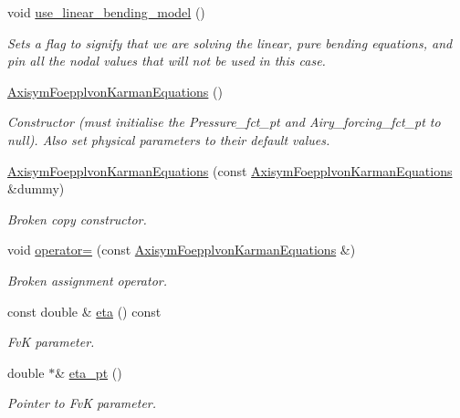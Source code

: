 \begin{DoxyCompactItemize}
void \hyperlink{classoomph_1_1AxisymFoepplvonKarmanEquations_abddb3d7358a6039420bf6ed58e7a5547}{use\+\_\+linear\+\_\+bending\+\_\+model} ()
\begin{DoxyCompactList}\small\item\em Sets a flag to signify that we are solving the linear, pure bending equations, and pin all the nodal values that will not be used in this case. \end{DoxyCompactList}\item 
\hyperlink{classoomph_1_1AxisymFoepplvonKarmanEquations_a73d54781a9dbf02beb79ccfeb5cc34e2}{Axisym\+Foepplvon\+Karman\+Equations} ()
\begin{DoxyCompactList}\small\item\em Constructor (must initialise the Pressure\+\_\+fct\+\_\+pt and Airy\+\_\+forcing\+\_\+fct\+\_\+pt to null). Also set physical parameters to their default values. \end{DoxyCompactList}\item 
\hyperlink{classoomph_1_1AxisymFoepplvonKarmanEquations_acd3d7267a7be9c94ff44fad533806e57}{Axisym\+Foepplvon\+Karman\+Equations} (const \hyperlink{classoomph_1_1AxisymFoepplvonKarmanEquations}{Axisym\+Foepplvon\+Karman\+Equations} \&dummy)
\begin{DoxyCompactList}\small\item\em Broken copy constructor. \end{DoxyCompactList}\item 
void \hyperlink{classoomph_1_1AxisymFoepplvonKarmanEquations_aaac38681e3450e4c9159e9b0c1b39b85}{operator=} (const \hyperlink{classoomph_1_1AxisymFoepplvonKarmanEquations}{Axisym\+Foepplvon\+Karman\+Equations} \&)
\begin{DoxyCompactList}\small\item\em Broken assignment operator. \end{DoxyCompactList}\item 
const double \& \hyperlink{classoomph_1_1AxisymFoepplvonKarmanEquations_a89a897222e4a40e2d258f4e95eb4ceeb}{eta} () const
\begin{DoxyCompactList}\small\item\em FvK parameter. \end{DoxyCompactList}\item 
double $\ast$\& \hyperlink{classoomph_1_1AxisymFoepplvonKarmanEquations_acdc1b386f9d5bf16512080ce0bfbbdee}{eta\+\_\+pt} ()
\begin{DoxyCompactList}\small\item\em Pointer to FvK parameter. \end{DoxyCompactList}\item 

\end{DoxyCompactItemize}
